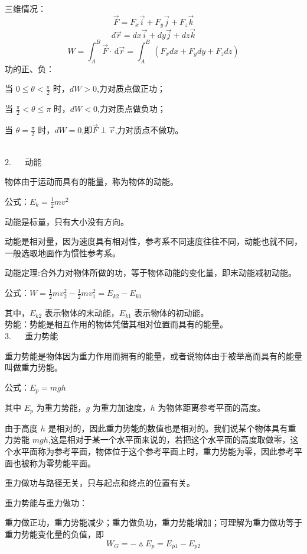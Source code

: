 \documentclass[12pt,a4paper]{article}
\begin{document}
三维情况：
$$
\overrightarrow{F}=F_x\overrightarrow{i}+F_y\overrightarrow{j}+F_z\overrightarrow{k}
$$
$$
d\overrightarrow{r}=dx\overrightarrow{i}+dy\overrightarrow{j}+dz\overrightarrow{k}
$$
$$
W=\int_{A}^{B} \overrightarrow{F}\cdot\, \mathrm{d}\overrightarrow{r}=\int_{A}^{B} \,(F_xdx+F_ydy+F_zdz) 
$$
功的正、负：

当 $0\le\theta < \frac{\pi}{2}$ 时，$dW>0$,力对质点做正功；

当 $\frac{\pi}{2} < \theta\le\pi$ 时，$dW<0$,力对质点做负功；

当 $\theta =\frac{\pi}{2}$ 时，$dW=0$,即$\overrightarrow{F}\perp\overrightarrow{r}$,力对质点不做功。

~ \\

$2$. ~~ 动能

物体由于运动而具有的能量，称为物体的动能。

公式：$E_k=\frac{1}{2}mv^2$

动能是标量，只有大小没有方向。

动能是相对量，因为速度具有相对性，参考系不同速度往往不同，动能也就不同，一般选取地面作为惯性参考系。

动能定理:合外力对物体所做的功，等于物体动能的变化量，即末动能减初动能。

公式：$W=\frac{1}{2}mv_2^2-\frac{1}{2}mv_1^2=E_{k2}-E_{k1}$

其中，$E_{k2}$ 表示物体的末动能，$E_{k1}$ 表示物体的初动能。\\


势能：势能是相互作用的物体凭借其相对位置而具有的能量。\\


$3$. ~~ 重力势能

重力势能是物体因为重力作用而拥有的能量，或者说物体由于被举高而具有的能量叫做重力势能。

公式：$E_p=mgh$ 

其中 $E_p$ 为重力势能，$g$ 为重力加速度，$h$ 为物体距离参考平面的高度。

由于高度 $h$ 是相对的，因此重力势能的数值也是相对的。我们说某个物体具有重力势能 $mgh$,这是相对于某一个水平面来说的，若把这个水平面的高度取做零，这个水平面称为参考平面，物体位于这个参考平面上时，重力势能为零，因此参考平面也被称为零势能平面。

重力做功与路径无关，只与起点和终点的位置有关。

重力势能与重力做功：

重力做正功，重力势能减少；重力做负功，重力势能增加；可理解为重力做功等于重力势能变化量的负值，即
$$
W_G=-\vartriangle E_p=E_{p1}-E_{p2}
$$
\end{document}
